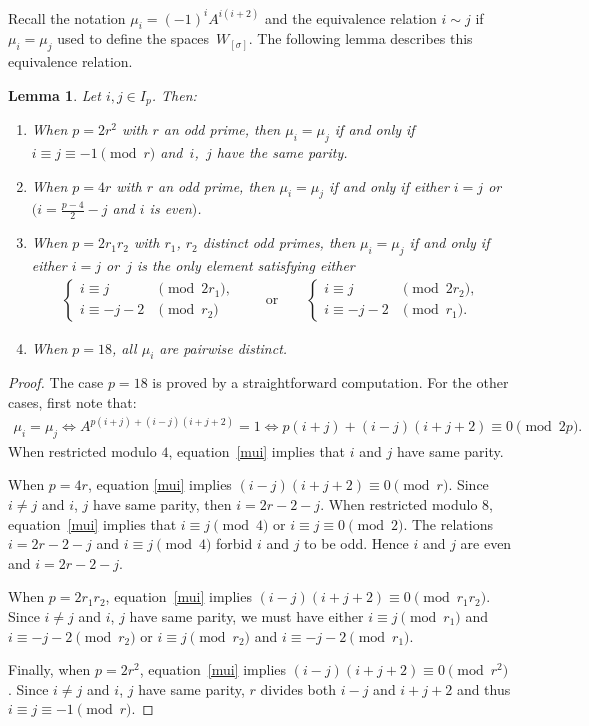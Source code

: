 \documentclass[11pt]{article}
\numberwithin{equation}{section}
\newtheorem{Lemma}[Theorem]{Lemma}
\begin{document}
Recall the notation $\mu_i=(-1)^iA^{i(i+2)}$ and the equivalence relation $i\sim j$ if $\mu_i=\mu_j$ used to define the spaces~$W_{[\sigma]}$. The following lemma describes this equivalence relation.
\begin{Lemma}\label{lemmachoucroute} Let $i,j\in I_p$. Then:
\begin{enumerate}\itemsep=0pt
\item[$1.$] When $p=2r^2$ with $r$ an odd prime, then $\mu_i=\mu_j$ if and only if $i\equiv j\equiv -1\pmod{r}$ and~$i$,~$j$ have the same parity.
\item[$2.$] When $p=4r$ with $r$ an odd prime, then $\mu_i=\mu_j$ if and only if either $i=j$ or $(i=\frac{p-4}{2} - j$ and $i$ is even$)$.
\item[$3.$] When $p=2r_1r_2$ with $r_1$, $r_2$ distinct odd primes, then $\mu_i=\mu_j$ if and only if either $i=j$ or~$j$ is the only element satisfying either
\begin{gather*} \begin{cases}
i\equiv j & \pmod{2r_1}, \\
i\equiv -j-2 & \pmod{r_2}
\end{cases}
\qquad \text{or}\qquad
 \begin{cases}
i\equiv j & \pmod{2r_2}, \\
i\equiv -j-2 & \pmod{r_1}.
\end{cases}
\end{gather*}
\item[$4.$] When $p=18$, all $\mu_i$ are pairwise distinct.
 \end{enumerate}
\end{Lemma}

\begin{proof}The case $p=18$ is proved by a straightforward computation. For the other cases, first note that:
\begin{gather}\label{mui}
 \mu_i=\mu_j \Leftrightarrow A^{p(i+j)+(i-j)(i+j+2)}=1 \Leftrightarrow p(i+j)+(i-j)(i+j+2)\equiv 0 \pmod{2p}.
\end{gather}
When restricted modulo $4$, equation~\eqref{mui} implies that $i$ and $j$ have same parity.

When $p=4r$, equation \eqref{mui} implies $(i-j)(i+j+2)\equiv 0 \pmod{r}$. Since $i\neq j$ and $i$, $j$ have same parity, then $i=2r-2-j$. When restricted modulo $8$, equation~\eqref{mui} implies that $i\equiv j\pmod{4}$ or $i\equiv j \equiv 0 \pmod{2}$. The relations $i=2r-2-j$ and $i\equiv j \pmod{4}$ forbid $i$ and $j$ to be odd. Hence $i$ and $j$ are even and $i=2r-2-j$.

When $p=2r_1r_2$, equation~\eqref{mui} implies $(i-j)(i+j+2) \equiv 0\pmod{r_1r_2}$. Since $i\neq j$ and $i$, $j$ have same parity, we must have either $i\equiv j \pmod{r_1}$ and $i\equiv -j-2 \pmod{r_2}$ or $i\equiv j \pmod{r_2}$ and $i\equiv -j-2 \pmod{r_1}$.

Finally, when $p=2r^2$, equation~\eqref{mui} implies $(i-j)(i+j+2) \equiv 0\pmod{r^2}$. Since $i\neq j$ and $i$, $j$ have same parity, $r$ divides both $i-j$ and $i+j+2$ and thus $i\equiv j \equiv -1 \pmod{r}$.
\end{proof}
\end{document}
